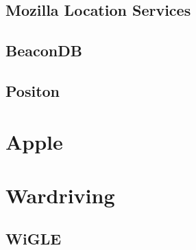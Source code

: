\documentclass[../wifi-security.tex]{subfiles}
\begin{document}

\subsection{Mozilla Location Services}

\subsection{BeaconDB}

\subsection{Positon}

\section{Apple}

\section{Wardriving}

\subsection{WiGLE}

\printbibliography[title={Chapter references}]
\end{document}
